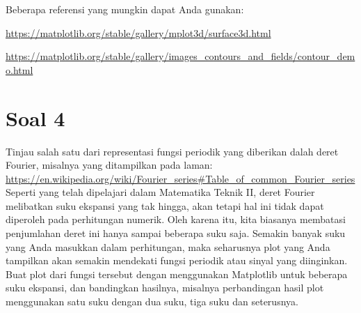 Beberapa referensi yang mungkin dapat Anda gunakan:

{\footnotesize
  \url{https://matplotlib.org/stable/gallery/mplot3d/surface3d.html}
}

{\footnotesize
  \url{https://matplotlib.org/stable/gallery/images_contours_and_fields/contour_demo.html}
}

\section{Soal 4}
Tinjau salah satu dari representasi fungsi periodik yang diberikan dalah deret Fourier, misalnya
yang ditampilkan pada laman:
{\footnotesize
\url{https://en.wikipedia.org/wiki/Fourier_series#Table_of_common_Fourier_series}}
Seperti yang telah dipelajari dalam Matematika Teknik II, deret Fourier melibatkan
suku ekspansi yang tak hingga, akan tetapi hal ini tidak dapat diperoleh pada perhitungan
numerik. Oleh karena itu, kita biasanya membatasi penjumlahan deret ini hanya sampai beberapa
suku saja.
Semakin banyak suku yang Anda masukkan
dalam perhitungan, maka seharusnya plot yang Anda tampilkan akan semakin mendekati
fungsi periodik atau sinyal
yang diinginkan.
Buat plot dari fungsi tersebut dengan menggunakan Matplotlib untuk beberapa
suku ekspansi, dan bandingkan hasilnya, misalnya perbandingan hasil plot menggunakan satu suku
dengan dua suku, tiga suku dan seterusnya.


